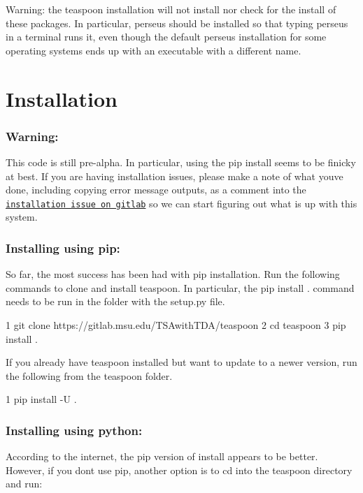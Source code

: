 Warning\+: the teaspoon installation will not install nor check for the install of these packages. In particular, perseus should be installed so that typing {\ttfamily perseus} in a terminal runs it, even though the default perseus installation for some operating systems ends up with an executable with a different name.

\section*{Installation }

\subsubsection*{Warning\+:}

This code is still pre-\/alpha. In particular, using the pip install seems to be finicky at best. If you are having installation issues, please make a note of what you\textquotesingle{}ve done, including copying error message outputs, as a comment into the \href{https://gitlab.msu.edu/TSAwithTDA/teaspoon/issues/1}{\tt installation issue on gitlab} so we can start figuring out what is up with this system.

\subsubsection*{Installing using pip\+:}

So far, the most success has been had with pip installation. Run the following commands to clone and install teaspoon. In particular, the {\ttfamily pip install .} command needs to be run in the folder with the {\ttfamily setup.\+py} file.


\begin{DoxyCode}
1 git clone https://gitlab.msu.edu/TSAwithTDA/teaspoon
2 cd teaspoon
3 pip install .
\end{DoxyCode}


If you already have teaspoon installed but want to update to a newer version, run the following from the teaspoon folder. 
\begin{DoxyCode}
1 pip install -U .
\end{DoxyCode}


\subsubsection*{Installing using python\+:}

According to the internet, the pip version of install appears to be better. However, if you don\textquotesingle{}t use pip, another option is to cd into the teaspoon directory and run\+:


